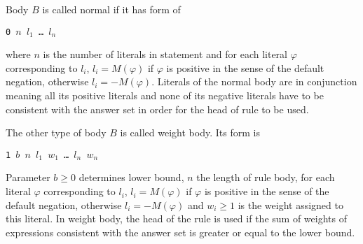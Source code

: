 Body $B$ is called normal if it has form of
\begin{center}
    \texttt{0 $n$ $l_1$ \dots{} $l_n$}
\end{center}
where $n$ is the number of literals in statement and for each literal $\varphi$
corresponding to $l_i$, $l_i = M(\varphi)$ if $\varphi$ is positive in the sense of
the default negation, otherwise $l_i = -M(\varphi)$.
Literals of the normal body are in conjunction meaning all its positive literals
and none of its negative literals have
to be consistent with the answer set in order for the head of rule to be used.

The other type of body $B$ is called weight body. Its form is
\begin{center}
    \texttt{1 $b$ $n$ $l_1$ $w_1$ \dots{}  $l_n$ $w_n$}
\end{center}
Parameter $b\geq 0$ determines lower bound, $n$
the length of rule body, for each literal $\varphi$ corresponding to $l_i$,
$l_i = M(\varphi)$ if $\varphi$ is positive in the sense of
the default negation, otherwise $l_i = -M(\varphi)$
and $w_i\geq 1$ is the weight assigned to this literal.
In weight body, the head of the rule is used if the sum of weights of expressions
consistent with the answer set is greater or equal to the lower bound.

